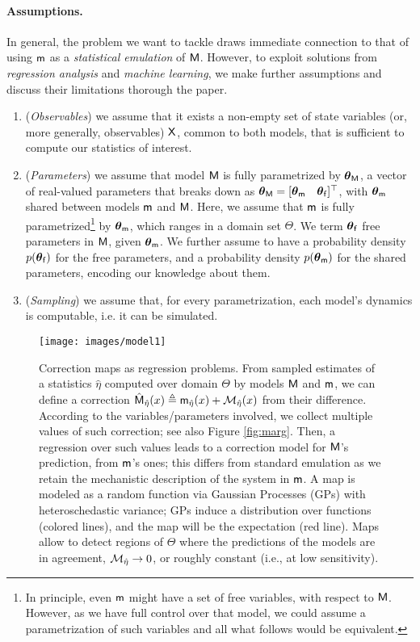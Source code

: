 \documentclass[runningheads,a4paper]{llncs}
\newcommand{\bM}{{\sf{M}}}
\newcommand{\ebM}{{\hat{\sf{M}}}}
\newcommand{\bm}{{\sf{m}}}
\newcommand{\cvar}{{\sf{X}}}
\newcommand{\pfpar}{\bth_{\sf{f}}}
\newcommand{\pmpar}{\bth_{\sf{m}}}
\newcommand{\pMpar}{\bth_{\sf{M}}}
\newcommand{\stat}{{\hat{\eta}}} %
\newcommand{\map}{{{\cal M}_\stat}}
\newcommand{\bth}{\boldsymbol{\theta}}
\begin{document}
\paragraph{Assumptions.} In general, the problem we want to tackle draws immediate connection to that of using $\bm$  as a {\em statistical emulation} of $\bM$. However, to exploit solutions from {\em regression analysis} and {\em machine learning}, we make   further assumptions and discuss their limitations thorough the paper. 

\begin{enumerate}
\item ({\em Observables}) we assume that  it exists a non-empty  set of state variables (or, more generally, observables) ${\cvar}$, common to both models, that is sufficient to compute our statistics of interest. 


\item ({\em Parameters}) we assume that model $\bM$ is fully  parametrized by  $\pMpar$, a vector of real-valued parameters that  breaks down as $\pMpar = [ \pmpar\quad \pfpar ]^\top$, with $\pmpar$ shared between models $\bm$ and $\bM$.
Here, we assume that $\bm$ is fully parametrized\footnote{In principle, even $\bm$ might have a set of free variables, with respect to $\bM$. However, as we have full control over that model, we could  assume a parametrization of such variables and all what follows would be equivalent.} by $\bth_{\bm}$, which ranges  in a domain set $\Theta$. We term $\pfpar$  free parameters in $\bM$, given $\bth_{\bm}$. We further assume to have a probability density $p(\pfpar)$ for the free parameters, and a probability density $p(\pmpar)$ for the shared parameters, encoding our knowledge about them. 

 
\item ({\em Sampling}) we assume that, for every parametrization,   each model's dynamics is computable, i.e. it can be simulated. 
 \end{enumerate}


\begin{figure}[t]
\centerline{
\texttt{[image: images/model1]}}
\caption{Correction maps as regression problems. From sampled estimates of a  statistics $\stat$ computed over  domain $\Theta$ by models $\bM$ and $\bm$, we can define a correction $\ebM_{\stat}(x)  \triangleq \bm_{\stat}(x) + {\map}(x)$ from their difference. According to the variables/parameters involved, we collect multiple values of such correction; see also Figure \ref{fig:marg}. Then, a regression over such values  leads to a correction model  for $\bM$'s prediction, from $\bm$'s ones; this differs from standard emulation as we retain the mechanistic description of the system in $\bm$. 
A map is modeled as a random function via Gaussian Processes (GPs) with heteroschedastic variance; GPs  induce a distribution over functions (colored lines), and the map will be the  expectation (red line). Maps allow to detect regions of $\Theta$ where the predictions of the models are in agreement, $\map \to 0$, or roughly constant (i.e., at low sensitivity).}
\label{fig:model}
\end{figure}
\end{document}
